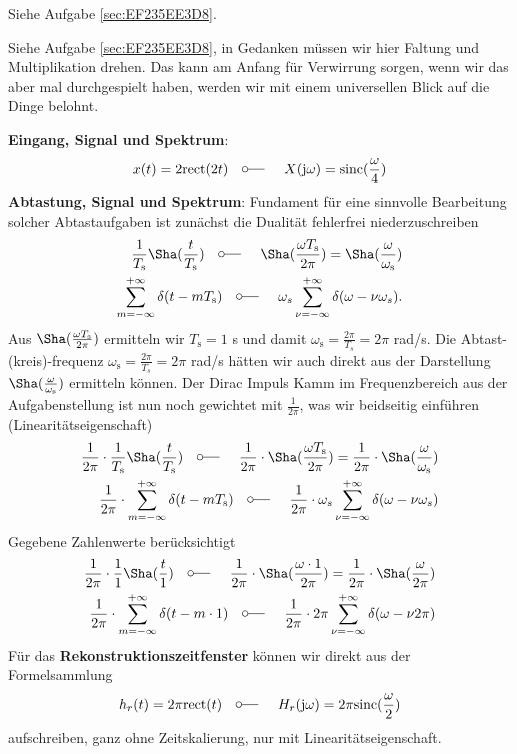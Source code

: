 \begin{Werkzeug}
Siehe Aufgabe \ref{sec:EF235EE3D8}.
\end{Werkzeug}
\begin{Ansatz}
Siehe Aufgabe \ref{sec:EF235EE3D8}, in Gedanken müssen wir hier Faltung und
Multiplikation drehen. Das kann am Anfang für Verwirrung sorgen, wenn wir das
aber mal durchgespielt haben, werden wir mit einem
universellen Blick auf die Dinge belohnt.
\end{Ansatz}
\begin{ExCalc}
\textbf{Eingang, Signal und Spektrum}:
\begin{align}
x(t) = 2 \mathrm{rect}(2 t)
\quad\fourier\quad
X(\im\omega) = \mathrm{sinc}(\frac{\omega}{4})
\end{align}
%
\textbf{Abtastung, Signal und Spektrum}:
Fundament für eine sinnvolle Bearbeitung solcher Abtastaufgaben ist zunächst die
Dualität fehlerfrei niederzuschreiben
\begin{align}
\frac{1}{T_\mathrm{s}} {\Sha}(\frac{t}{T_\mathrm{s}}) \quad\fourier\quad
{\Sha}(\frac{\omega T_\mathrm{s}}{2 \pi}) =
\Sha(\frac{\omega}{\omega_\mathrm{s}})\\
\sum_{m=-\infty}^{+\infty} \delta(t-m T_\mathrm{s}) \quad\fourier\quad
\omega_s \sum_{\nu=-\infty}^{+\infty} \delta(\omega-\nu \omega_s).
\end{align}
Aus ${\Sha}(\frac{\omega T_\mathrm{s}}{2 \pi})$ ermitteln wir
$T_\mathrm{s} = 1$ s und damit $\omega_\mathrm{s}=\frac{2\pi}{T_s} = 2\pi$ rad/s.
Die Abtast-(kreis)-frequenz $\omega_\mathrm{s}=\frac{2\pi}{T_s} = 2\pi$ rad/s
hätten wir auch direkt aus der Darstellung $\Sha(\frac{\omega}{\omega_\mathrm{s}})$
ermitteln können.
%
Der Dirac Impuls Kamm im Frequenzbereich aus der Aufgabenstellung ist nun noch
gewichtet mit $\frac{1}{2\pi}$, was wir beidseitig einführen (Linearitätseigenschaft)
\begin{align}
\frac{1}{2\pi}\cdot\frac{1}{T_\mathrm{s}} {\Sha}(\frac{t}{T_\mathrm{s}}) \quad\fourier\quad
\frac{1}{2\pi}\cdot{\Sha}(\frac{\omega T_\mathrm{s}}{2 \pi}) =
\frac{1}{2\pi}\cdot\Sha(\frac{\omega}{\omega_\mathrm{s}})\\
\frac{1}{2\pi}\cdot\sum_{m=-\infty}^{+\infty} \delta(t-m T_\mathrm{s}) \quad\fourier\quad
\frac{1}{2\pi}\cdot\omega_s \sum_{\nu=-\infty}^{+\infty} \delta(\omega-\nu \omega_s)
\end{align}
%
Gegebene Zahlenwerte berücksichtigt
\begin{align}
\frac{1}{2\pi}\cdot\frac{1}{1} {\Sha}(\frac{t}{1}) \quad\fourier\quad
\frac{1}{2\pi}\cdot{\Sha}(\frac{\omega \cdot 1}{2 \pi}) =
\frac{1}{2\pi}\cdot\Sha(\frac{\omega}{2\pi})\\
\frac{1}{2\pi}\cdot\sum_{m=-\infty}^{+\infty} \delta(t-m \cdot 1) \quad\fourier\quad
\frac{1}{2\pi}\cdot 2\pi \sum_{\nu=-\infty}^{+\infty} \delta(\omega-\nu 2\pi)
\end{align}
%
Für das \textbf{Rekonstruktionszeitfenster} können wir direkt aus der Formelsammlung
\begin{align}
h_r(t) = 2\pi\mathrm{rect}(t)
\quad\fourier\quad
H_r(\im\omega) = 2\pi\mathrm{sinc}(\frac{\omega}{2})
\end{align}
aufschreiben, ganz ohne Zeitskalierung, nur mit Linearitätseigenschaft.
%
\end{ExCalc}
